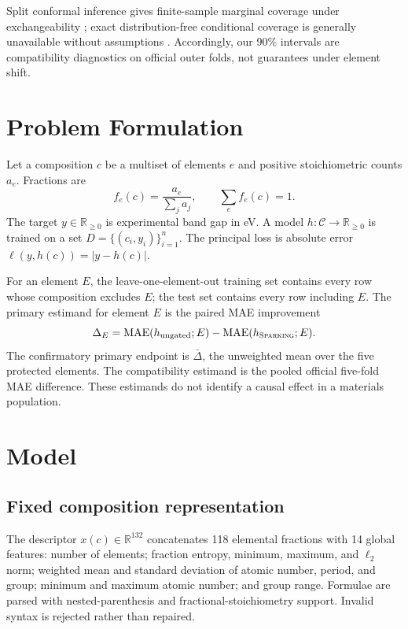\documentclass[11pt]{article}
\newcommand{\method}{\textsc{Sparking}}
\begin{document}
Split conformal inference gives finite-sample marginal coverage under
exchangeability \citep{lei2018conformal}; exact distribution-free conditional
coverage is generally unavailable without assumptions \citep{barber2021limits}.
Accordingly, our 90\% intervals are compatibility diagnostics on official outer
folds, not guarantees under element shift.

\section{Problem Formulation}
Let a composition $c$ be a multiset of elements $e$ and positive stoichiometric
counts $a_e$. Fractions are
\begin{equation}
 f_e(c)=\frac{a_e}{\sum_j a_j}, \qquad \sum_e f_e(c)=1.
\end{equation}
The target $y\in\mathbb{R}_{\ge 0}$ is experimental band gap in eV. A model
$h:\mathcal{C}\rightarrow\mathbb{R}_{\ge0}$ is trained on a set
$D=\{(c_i,y_i)\}_{i=1}^n$. The principal loss is absolute error
$\ell(y,h(c))=|y-h(c)|$.

For an element $E$, the leave-one-element-out training set contains every row
whose composition excludes $E$; the test set contains every row including $E$.
The primary estimand for element $E$ is the paired MAE improvement
\begin{equation}
 \Delta_E = \operatorname{MAE}(h_{\mathrm{ungated}};E)
 - \operatorname{MAE}(h_{\method};E).
\end{equation}
The confirmatory primary endpoint is $\bar\Delta$, the unweighted mean over the
five protected elements. The compatibility estimand is the pooled official
five-fold MAE difference. These estimands do not identify a causal effect in a
materials population.

\section{Model}
\subsection{Fixed composition representation}
The descriptor $x(c)\in\mathbb{R}^{132}$ concatenates 118 elemental fractions
with 14 global features: number of elements; fraction entropy, minimum, maximum,
and $\ell_2$ norm; weighted mean and standard deviation of atomic number,
period, and group; minimum and maximum atomic number; and group range. Formulae
are parsed with nested-parenthesis and fractional-stoichiometry support. Invalid
syntax is rejected rather than repaired.
\end{document}
